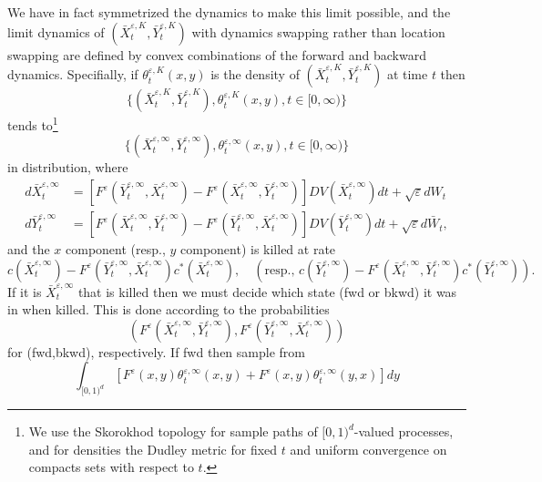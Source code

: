 \documentclass[english,11pt]{article}%
\numberwithin{equation}{section}
\numberwithin{example}{section}
\numberwithin{theorem}{section}
\begin{document}
We have in fact symmetrized the dynamics to make this limit possible, and the
limit dynamics of $(\bar{X}_{t}^{\varepsilon,K},\bar{Y}_{t}^{\varepsilon,K})$
with dynamics swapping rather than location swapping are defined by convex
combinations of the forward and backward dynamics. Specifially, if $\theta
_{t}^{\varepsilon,K}(x,y)$ is the density of $(\bar{X}_{t}^{\varepsilon
,K},\bar{Y}_{t}^{\varepsilon,K})$ at time $t$ then
\[
\{(\bar{X}_{t}^{\varepsilon,K},\bar{Y}_{t}^{\varepsilon,K}),\theta
_{t}^{\varepsilon,K}(x,y),t\in\lbrack0,\infty)\}
\]
tends to\footnote{We use the Skorokhod topology for sample paths of 
$[0,1)^d$-valued processes, and for densities the Dudley metric
for fixed $t$ and uniform convergence on compacts sets with respect to $t$.}
\[
\{(\bar{X}_{t}^{\varepsilon,\infty},\bar{Y}_{t}^{\varepsilon,\infty}%
),\theta_{t}^{\varepsilon,\infty}(x,y),t\in\lbrack0,\infty)\}
\]
in distribution, where
\begin{align*}
d\bar{X}_{t}^{\varepsilon,\infty} &  =\left[  F^{\varepsilon}(\bar{Y}%
_{t}^{\varepsilon,\infty},\bar{X}_{t}^{\varepsilon,\infty})-F^{\varepsilon
}(\bar{X}_{t}^{\varepsilon,\infty},\bar{Y}_{t}^{\varepsilon,\infty})\right]
DV(\bar{X}_{t}^{\varepsilon,\infty})dt+\sqrt{\varepsilon}dW_t\\
d\bar{Y}_{t}^{\varepsilon,\infty} &  =\left[  F^{\varepsilon}(\bar{X}%
_{t}^{\varepsilon,\infty},\bar{Y}_{t}^{\varepsilon,\infty})-F^{\varepsilon
}(\bar{Y}_{t}^{\varepsilon,\infty},\bar{X}_{t}^{\varepsilon,\infty})\right]
DV(\bar{Y}_{t}^{\varepsilon,\infty})dt+\sqrt{\varepsilon}d\bar{W}_t,
\end{align*}
and the $x$ component (resp., $y$ component) is killed at rate
\[
c(\bar{X}_{t}^{\varepsilon,\infty})-F^{\varepsilon}(\bar{Y}_{t}^{\varepsilon
,\infty},\bar{X}_{t}^{\varepsilon,\infty})c^{\ast}(\bar{X}_{t}^{\varepsilon
,\infty}),\quad(\text{resp., }c(\bar{Y}_{t}^{\varepsilon,\infty}%
)-F^{\varepsilon}(\bar{X}_{t}^{\varepsilon,\infty},\bar{Y}_{t}^{\varepsilon
,\infty})c^{\ast}(\bar{Y}_{t}^{\varepsilon,\infty})).
\]
If it is $\bar{X}_{t}^{\varepsilon,\infty}$ that is killed then we must decide
which state (fwd or bkwd) it was in when killed. This is done according to the
probabilities
\[
(F^{\varepsilon}(\bar{X}_{t}^{\varepsilon,\infty},\bar{Y}_{t}^{\varepsilon
,\infty}),F^{\varepsilon}(\bar{Y}_{t}^{\varepsilon,\infty},\bar{X}%
_{t}^{\varepsilon,\infty}))
\]
for (fwd,bkwd), respectively. If fwd then sample from
\[
\int_{\lbrack0,1)^{d}}\left[  F^{\varepsilon}(x,y)\theta_{t}^{\varepsilon
,\infty}(x,y)+F^{\varepsilon}(x,y)\theta_{t}^{\varepsilon,\infty}(y,x)\right]
dy
\]
\end{document}
